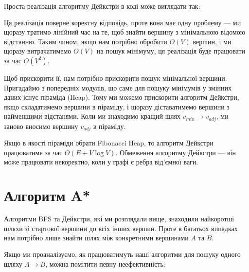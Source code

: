 \documentclass[12pt,a4paper]{report}
\begin{document}
Проста реалізація алгоритму Дейкстри в коді може виглядати так:



Ця реалізація поверне коректну відповідь, проте вона має одну проблему --- ми щоразу тратимо лінійний час на те, щоб знайти вершину з мінімальною відомою відстанню.
Таким чином, якщо нам потрібно обробити \(O(V)\) вершин, і ми щоразу витрачатимемо \(O(V)\) на пошук мінімуму, ця реалізація буде працювати за час \(O(V^2)\).

Щоб прискорити її, нам потрібно прискорити пошук мінімальної вершини. Пригадаймо з попередніх модулів, що саме для пошуку мінімумів у змінних даних існує піраміда (Heap). Тому ми можемо прискорити алгоритм Дейкстри, якщо складатимемо вершини в піраміду, і щоразу діставатимемо вершини з найменшими відстанями. Коли ми знаходимо кращий шлях \(v_{min} \rightarrow v_{adj}\), ми заново вносимо вершину \(v_{adj}\) в піраміду.



Якщо в якості піраміди обрати Fibonacci Heap, то алгоритм Дейкстри працюватиме за час \(O(E + V \log V)\). Обмеження алгоритму Дейкстри --- він може працювати некоректно, коли у графі є ребра від’ємної ваги.



\section{Алгоритм A*}

Алгоритми BFS та Дейкстри, які ми розглядали вище, знаходили найкоротші шляхи зі стартової вершини до всіх інших вершин. Проте в багатьох випадках нам потрібно лише знайти шлях між конкретними вершинами \(A\) та \(B\).

Якщо ми проаналізуємо, як працюватимуть наші алгоритми для пошуку одного шляху \(A \rightarrow B\), можна помітити певну неефективність:
\end{document}
